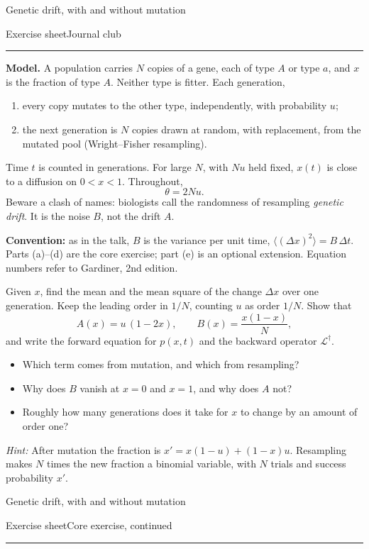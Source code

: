 \documentclass[11pt]{article}
\newcommand{\avg}[1]{\langle #1\rangle}
\newcommand{\sheethead}[1]{%
  {\sffamily\Large\color{PineGreen}Genetic drift, with and without mutation}\par\vspace{2pt}
  {\sffamily\small Exercise sheet\hfill #1}\par\vspace{-7pt}
  \rule{\textwidth}{0.5pt}\par\vspace{2pt}}
\newcommand{\exsec}[1]{\par\vspace{4pt}{\sffamily\bfseries\large\color{PineGreen}#1}\par\vspace{-2pt}}
\begin{document}
\sheethead{Journal club}

\textbf{Model.} A population carries $N$ copies of a gene, each of type $A$ or type $a$, and $x$ is the fraction
of type $A$. Neither type is fitter. Each generation,
\begin{enumerate}
  \item every copy mutates to the other type, independently, with probability $u$;
  \item the next generation is $N$ copies drawn at random, with replacement, from the mutated pool
        (Wright--Fisher resampling).
\end{enumerate}
Time $t$ is counted in generations. For large $N$, with $Nu$ held fixed, $x(t)$ is close to a diffusion on
$0<x<1$. Throughout,
\[ \theta=2Nu. \]
Beware a clash of names: biologists call the randomness of resampling \emph{genetic drift}. It is the noise
$B$, not the drift $A$.

\textbf{Convention:} as in the talk, $B$ is the variance per unit time, $\avg{(\Delta x)^2}=B\,\Delta t$. Parts
(a)--(d) are the core exercise; part (e) is an optional extension. Equation numbers refer to Gardiner, 2nd edition.

\exsec{(a) Build the forward equation}
Given $x$, find the mean and the mean square of the change $\Delta x$ over one generation. Keep the leading order
in $1/N$, counting $u$ as order $1/N$. Show that
\[ A(x)=u\,(1-2x),\qquad B(x)=\frac{x(1-x)}N, \]
and write the forward equation for $p(x,t)$ and the backward operator $\mathcal L^\dagger$.
\begin{itemize}
  \item Which term comes from mutation, and which from resampling?
  \item Why does $B$ vanish at $x=0$ and $x=1$, and why does $A$ not?
  \item Roughly how many generations does it take for $x$ to change by an amount of order one?
\end{itemize}
\emph{Hint:} After mutation the fraction is $x'=x(1-u)+(1-x)u$. Resampling makes $N$ times the new fraction a
binomial variable, with $N$ trials and success probability $x'$.

\vfill
\newpage

\sheethead{Core exercise, continued}
\end{document}
